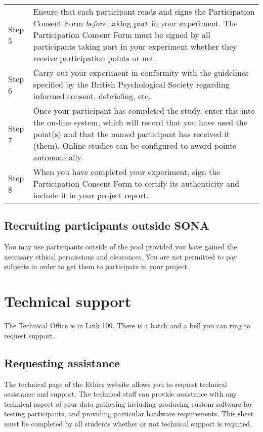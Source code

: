 \documentclass[
]{book}
\begin{document}
\begin{longtable}[]{@{}
  >{\raggedright\arraybackslash}p{}
  >{\raggedright\arraybackslash}p{}@{}}
Step 5 & Ensure that each participant reads and signs the Participation Consent Form \emph{before} taking part in your experiment. The Participation Consent Form must be signed by all participants taking part in your experiment whether they receive participation points or not. \\
Step 6 & Carry out your experiment in conformity with the guidelines specified by the British Psychological Society regarding informed consent, debriefing, etc. \\
Step 7 & Once your participant has completed the study, enter this into the on-line system, which will record that you have used the point(s) and that the named participant has received it (them). Online studies can be configured to award points automatically. \\
Step 8 & When you have completed your experiment, sign the Participation Consent Form to certify its authenticity and include it in your project report. \\
\end{longtable}

\section{Recruiting participants outside SONA}\label{recruiting-participants-outside-sona}

You may use participants outside of the pool provided you have gained the necessary ethical permissions and clearances. You are not permitted to pay subjects in order to get them to participate in your project.

\chapter{Technical support}\label{technical-support}

The Technical Office is in Link 109. There is a hatch and a bell you can ring to request support.

\section{Requesting assistance}\label{requesting-assistance}

The technical page of the Ethics website allows you to request technical assistance and support. The technical staff can provide assistance with any technical aspect of your data gathering including producing custom software for testing participants, and providing particular hardware requirements. This sheet must be completed by all students whether or not technical support is required.
\end{document}
